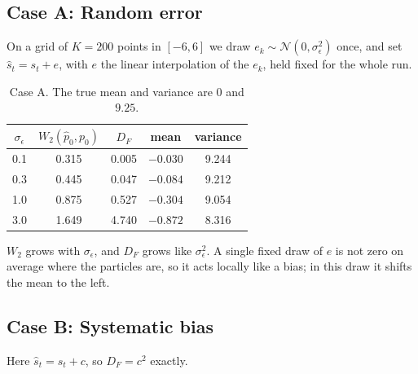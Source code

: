\documentclass[11pt]{article}
\newcommand{\N}{\mathcal{N}}
\begin{document}
\subsection*{Case A: Random error}

On a grid of $K=200$ points in $[-6,6]$ we draw $e_k\sim\N(0,\sigma_\epsilon^2)$ once, and set $\hat s_t = s_t + e$, with $e$ the linear interpolation of
the $e_k$, held fixed for the whole run.

\begin{table}[H]
\centering
\begin{tabular}{ccccc}
\hline
$\sigma_\epsilon$ & $W_2(\hat p_0,p_0)$ & $D_F$ & mean & variance \\
\hline
0.1 & 0.315 & 0.005 & $-0.030$ & 9.244 \\
0.3 & 0.445 & 0.047 & $-0.084$ & 9.212 \\
1.0 & 0.875 & 0.527 & $-0.304$ & 9.054 \\
3.0 & 1.649 & 4.740 & $-0.872$ & 8.316 \\
\hline
\end{tabular}
\caption{Case A. The true mean and variance are $0$ and $9.25$.}
\label{tab:caseA}
\end{table}

$W_2$ grows with $\sigma_\epsilon$, and $D_F$ grows like $\sigma_\epsilon^2$. A single fixed draw of $e$ is not zero on average where the
particles are, so it acts locally like a bias; in this draw it shifts the mean to the left.

\subsection*{Case B: Systematic bias}

Here $\hat s_t = s_t + c$, so $D_F = c^2$ exactly.
\end{document}
